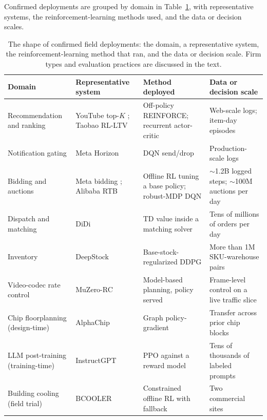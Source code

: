 Confirmed deployments are grouped by domain in Table~\ref{tab:field_shape}, with representative systems, the reinforcement-learning methods used, and the data or decision scales.

\begin{table}[t]
\centering
\footnotesize
\begin{tabularx}{\textwidth}{@{}>{\raggedright\arraybackslash}p{}>{\raggedright\arraybackslash}X>{\raggedright\arraybackslash}p{}>{\raggedright\arraybackslash}p{}@{}}
\toprule
Domain & Representative system & Method deployed & Data or decision scale \\
\midrule
Recommendation and ranking & YouTube top-$K$ \citep{Chen2019YouTubeTopK}; Taobao RL-LTV \citep{Ji2021RLLTV} & Off-policy REINFORCE; recurrent actor-critic & Web-scale logs; item-day episodes \\
Notification gating & Meta Horizon \citep{Gauci2019Horizon} & DQN send/drop & Production-scale logs \\
Bidding and auctions & Meta bidding \citep{Korenkevych2023MetaBidding}; Alibaba RTB \citep{Zhao2018SponsoredSearchRTB} & Offline RL tuning a base policy; robust-MDP DQN & $\sim$1.2B logged steps; $\sim$100M auctions per day \\
Dispatch and matching & DiDi \citep{SadeghiEshkevari2022DiDiScalable} & TD value inside a matching solver & Tens of millions of orders per day \\
Inventory & DeepStock \citep{Xie2026DeepStock} & Base-stock-regularized DDPG & More than 1M SKU-warehouse pairs \\
Video-codec rate control & MuZero-RC \citep{Mandhane2022MuZeroRC} & Model-based planning, policy served & Frame-level control on a live traffic slice \\
Chip floorplanning (design-time) & AlphaChip \citep{Mirhoseini2021GraphPlacement} & Graph policy-gradient & Transfer across prior chip blocks \\
LLM post-training (training-time) & InstructGPT \citep{ouyang2022training} & PPO against a reward model & Tens of thousands of labeled prompts \\
Building cooling (field trial) & BCOOLER \citep{Luo2022BCOOLER} & Constrained offline RL with fallback & Two commercial sites \\
\bottomrule
\end{tabularx}
\caption{The shape of confirmed field deployments: the domain, a representative system, the reinforcement-learning method that ran, and the data or decision scale. Firm types and evaluation practices are discussed in the text.}
\label{tab:field_shape}
\end{table}


